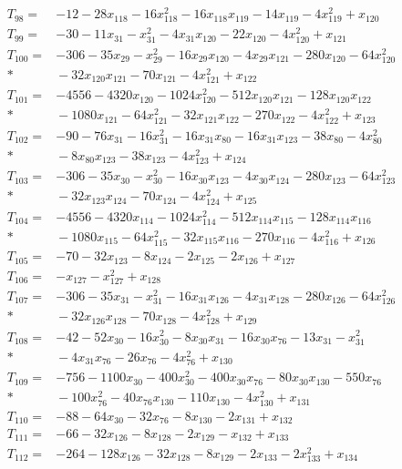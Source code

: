 \begin{align*}
T_{98}={}&-12-28x_{118}-16x_{118}^{2}-16x_{118}x_{119}-14x_{119}-4x_{119}^{2}+x_{120}\\[3pt]
T_{99}={}&-30-11x_{31}-x_{31}^{2}-4x_{31}x_{120}-22x_{120}-4x_{120}^{2}+x_{121}\\[3pt]
T_{100}={}&-306-35x_{29}-x_{29}^{2}-16x_{29}x_{120}-4x_{29}x_{121}-280x_{120}-64x_{120}^{2}\\*
&{}-32x_{120}x_{121}-70x_{121}-4x_{121}^{2}+x_{122}\\[3pt]
T_{101}={}&-4556-4320x_{120}-1024x_{120}^{2}-512x_{120}x_{121}-128x_{120}x_{122}\\*
&{}-1080x_{121}-64x_{121}^{2}-32x_{121}x_{122}-270x_{122}-4x_{122}^{2}+x_{123}\\[3pt]
T_{102}={}&-90-76x_{31}-16x_{31}^{2}-16x_{31}x_{80}-16x_{31}x_{123}-38x_{80}-4x_{80}^{2}\\*
&{}-8x_{80}x_{123}-38x_{123}-4x_{123}^{2}+x_{124}\\[3pt]
T_{103}={}&-306-35x_{30}-x_{30}^{2}-16x_{30}x_{123}-4x_{30}x_{124}-280x_{123}-64x_{123}^{2}\\*
&{}-32x_{123}x_{124}-70x_{124}-4x_{124}^{2}+x_{125}\\[3pt]
T_{104}={}&-4556-4320x_{114}-1024x_{114}^{2}-512x_{114}x_{115}-128x_{114}x_{116}\\*
&{}-1080x_{115}-64x_{115}^{2}-32x_{115}x_{116}-270x_{116}-4x_{116}^{2}+x_{126}\\[3pt]
T_{105}={}&-70-32x_{123}-8x_{124}-2x_{125}-2x_{126}+x_{127}\\[3pt]
T_{106}={}&-x_{127}-x_{127}^{2}+x_{128}\\[3pt]
T_{107}={}&-306-35x_{31}-x_{31}^{2}-16x_{31}x_{126}-4x_{31}x_{128}-280x_{126}-64x_{126}^{2}\\*
&{}-32x_{126}x_{128}-70x_{128}-4x_{128}^{2}+x_{129}\\[3pt]
T_{108}={}&-42-52x_{30}-16x_{30}^{2}-8x_{30}x_{31}-16x_{30}x_{76}-13x_{31}-x_{31}^{2}\\*
&{}-4x_{31}x_{76}-26x_{76}-4x_{76}^{2}+x_{130}\\[3pt]
T_{109}={}&-756-1100x_{30}-400x_{30}^{2}-400x_{30}x_{76}-80x_{30}x_{130}-550x_{76}\\*
&{}-100x_{76}^{2}-40x_{76}x_{130}-110x_{130}-4x_{130}^{2}+x_{131}\\[3pt]
T_{110}={}&-88-64x_{30}-32x_{76}-8x_{130}-2x_{131}+x_{132}\\[3pt]
T_{111}={}&-66-32x_{126}-8x_{128}-2x_{129}-x_{132}+x_{133}\\[3pt]
T_{112}={}&-264-128x_{126}-32x_{128}-8x_{129}-2x_{133}-2x_{133}^{2}+x_{134}\\[3pt]

\end{align*}
